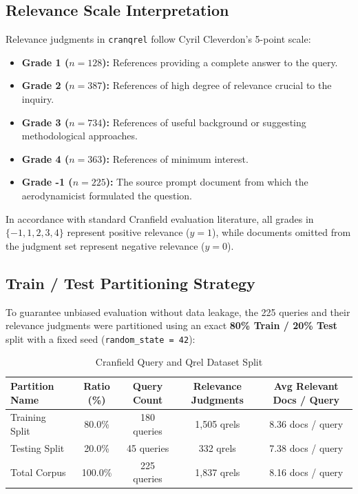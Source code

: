 \documentclass[11pt,a4paper]{article}
\begin{document}
\subsection{Relevance Scale Interpretation}
Relevance judgments in \texttt{cranqrel} follow Cyril Cleverdon's 5-point scale:
\begin{itemize}[leftmargin=*]
    \item \textbf{Grade 1 ($n = 128$):} References providing a complete answer to the query.
    \item \textbf{Grade 2 ($n = 387$):} References of high degree of relevance crucial to the inquiry.
    \item \textbf{Grade 3 ($n = 734$):} References of useful background or suggesting methodological approaches.
    \item \textbf{Grade 4 ($n = 363$):} References of minimum interest.
    \item \textbf{Grade -1 ($n = 225$):} The source prompt document from which the aerodynamicist formulated the question.
\end{itemize}
In accordance with standard Cranfield evaluation literature, all grades in $\{-1, 1, 2, 3, 4\}$ represent positive relevance ($y = 1$), while documents omitted from the judgment set represent negative relevance ($y = 0$).

\subsection{Train / Test Partitioning Strategy}
To guarantee unbiased evaluation without data leakage, the 225 queries and their relevance judgments were partitioned using an exact \textbf{80\% Train / 20\% Test} split with a fixed seed (\texttt{random\_state = 42}):
\begin{table}[H]
\centering
\small
\caption{Cranfield Query and Qrel Dataset Split}
\label{tab:split}
\renewcommand{\arraystretch}{1.2}
\begin{tabularx}{\textwidth}{lcccc}
\toprule
\textbf{Partition Name} & \textbf{Ratio (\%)} & \textbf{Query Count} & \textbf{Relevance Judgments} & \textbf{Avg Relevant Docs / Query} \\
\midrule
Training Split & 80.0\% & 180 queries & 1,505 qrels & 8.36 docs / query \\
Testing Split & 20.0\% & 45 queries & 332 qrels & 7.38 docs / query \\
Total Corpus & 100.0\% & 225 queries & 1,837 qrels & 8.16 docs / query \\
\bottomrule
\end{tabularx}
\end{table}
\end{document}
